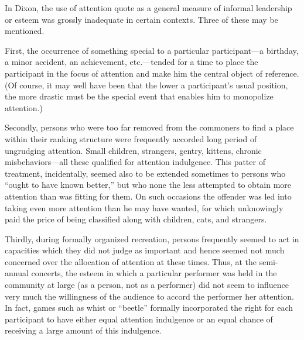 \documentclass[twoside,symmetric,nobib,justified]{tufte-book}
\begin{document}
In Dixon, the use of attention quote as a general measure of informal
leadership or esteem was grossly inadequate in certain contexts. Three
of these may be mentioned.

First, the occurrence of something special to a particular
participant---a birthday, a minor accident, an achievement,
etc.---tended for a time to place the participant in the focus of
attention and make him the central object of reference. (Of course, it
may well have been that the lower a participant's usual position, the
more drastic must be the special event that enables him to monopolize
attention.)

Secondly, persons who were too far removed from the commoners to find a
place within their ranking structure were frequently accorded long
period of ungrudging attention. Small children, strangers, gentry,
kittens, chronic misbehaviors---all these qualified for attention
indulgence. This patter of treatment, incidentally, seemed also to be
extended sometimes to persons who ``ought to have known better,'' but
who none the less attempted to obtain more attention than was fitting
for them. On such occasions the offender was led into taking even more
attention than he may have wanted, for which unknowingly paid the price
of being classified along with children, cats, and strangers.

Thirdly, during formally organized recreation, persons frequently seemed
to act in capacities which they did not judge as important and hence
seemed not much concerned over the allocation of attention at these
times. Thus, at the semi-annual concerts, the esteem in which a
particular performer was held in the community at large (as a person,
not as a performer) did not seem to influence very much the willingness
of the audience to accord the performer her attention. In fact, games
such as whist or ``beetle'' formally incorporated the right for each
participant to have either equal attention indulgence or an equal chance
of receiving a large amount of this indulgence.
\end{document}
